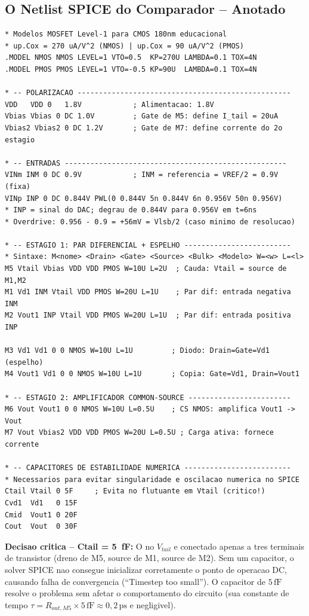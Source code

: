 \documentclass[12pt, a4paper]{article}
\begin{document}
\subsection{O Netlist SPICE do Comparador -- Anotado}

\begin{lstlisting}[caption={Netlist pre-layout do comparador (comparator\_prelayout.cir) -- secao de transistores com explicacao de cada conexao.}]
* Modelos MOSFET Level-1 para CMOS 180nm educacional
* up.Cox = 270 uA/V^2 (NMOS) | up.Cox = 90 uA/V^2 (PMOS)
.MODEL NMOS NMOS LEVEL=1 VTO=0.5  KP=270U LAMBDA=0.1 TOX=4N
.MODEL PMOS PMOS LEVEL=1 VTO=-0.5 KP=90U  LAMBDA=0.1 TOX=4N

* -- POLARIZACAO --------------------------------------------------
VDD   VDD 0   1.8V            ; Alimentacao: 1.8V
Vbias Vbias 0 DC 1.0V         ; Gate de M5: define I_tail = 20uA
Vbias2 Vbias2 0 DC 1.2V       ; Gate de M7: define corrente do 2o estagio

* -- ENTRADAS ----------------------------------------------------
VINm INM 0 DC 0.9V            ; INM = referencia = VREF/2 = 0.9V (fixa)
VINp INP 0 DC 0.844V PWL(0 0.844V 5n 0.844V 6n 0.956V 50n 0.956V)
* INP = sinal do DAC; degrau de 0.844V para 0.956V em t=6ns
* Overdrive: 0.956 - 0.9 = +56mV = Vlsb/2 (caso minimo de resolucao)

* -- ESTAGIO 1: PAR DIFERENCIAL + ESPELHO -------------------------
* Sintaxe: M<nome> <Drain> <Gate> <Source> <Bulk> <Modelo> W=<w> L=<l>
M5 Vtail Vbias VDD VDD PMOS W=10U L=2U  ; Cauda: Vtail = source de M1,M2
M1 Vd1 INM Vtail VDD PMOS W=20U L=1U    ; Par dif: entrada negativa INM
M2 Vout1 INP Vtail VDD PMOS W=20U L=1U  ; Par dif: entrada positiva INP

M3 Vd1 Vd1 0 0 NMOS W=10U L=1U         ; Diodo: Drain=Gate=Vd1 (espelho)
M4 Vout1 Vd1 0 0 NMOS W=10U L=1U       ; Copia: Gate=Vd1, Drain=Vout1

* -- ESTAGIO 2: AMPLIFICADOR COMMON-SOURCE ------------------------
M6 Vout Vout1 0 0 NMOS W=10U L=0.5U    ; CS NMOS: amplifica Vout1 -> Vout
M7 Vout Vbias2 VDD VDD PMOS W=20U L=0.5U ; Carga ativa: fornece corrente

* -- CAPACITORES DE ESTABILIDADE NUMERICA -------------------------
* Necessarios para evitar singularidade e oscilacao numerica no SPICE
Ctail Vtail 0 5F     ; Evita no flutuante em Vtail (critico!)
Cvd1  Vd1   0 15F
Cmid  Vout1 0 20F
Cout  Vout  0 30F
\end{lstlisting}

\textbf{Decisao critica -- Ctail = 5~fF:} O no $V_{tail}$ e conectado apenas a tres terminais
de transistor (dreno de M5, source de M1, source de M2). Sem um capacitor, o solver SPICE
nao consegue inicializar corretamente o ponto de operacao DC, causando falha de convergencia
(``Timestep too small''). O capacitor de $5\,\text{fF}$ resolve o problema sem afetar o
comportamento do circuito (sua constante de tempo $\tau = R_{out,M5} \times 5\,\text{fF}
\approx 0{,}2\,\text{ps}$ e negligivel).
\end{document}
